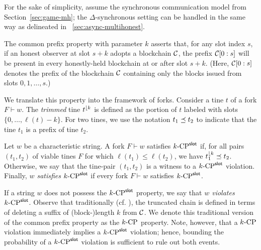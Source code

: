   For the sake of simplicity, 
  assume the synchronous communication model from Section~\ref{sec:game-mh}; 
  the $\Delta$-synchronous setting can be handled in the same way 
  as delineated in \Section~\ref{sec:async-multihonest}.

  The common prefix property with parameter $k$ asserts
  that, for any slot index $s$, if an honest observer at slot $s + k$
  adopts a blockchain $\mathcal{C}$, the prefix $\mathcal{C}[0 : s]$ will be
  present in every honestly-held blockchain at or after slot $s + k$.
  (Here, $\mathcal{C}[0 : s]$ denotes the prefix of the blockchain $\mathcal{C}$
  containing only the blocks issued from slots $0, 1, \ldots, s$.)

  We translate this property into the framework of forks.  Consider a
  tine $t$ of a fork $F \vdash w$.  The \emph{trimmed} tine
  $t^{\lfloor {k}}$ is defined as the portion of $t$ labeled with slots
  $\{ 0, \ldots, \ell(t) - k\}$. For two tines, we use the notation
  $t_1 \preceq t_2$ to indicate that the tine $t_1$ is a
  prefix of tine $t_2$.

  \begin{definition}\label{def:cp-slot-mh}
    Let $w$ be a characteristic string. A fork $F \vdash w$ satisfies
    ${k}\text{-}\mathrm{CP}^{\mathsf{slot}}$ if, for all pairs $(t_1, t_2)$ of viable tines $F$ for
    which $\ell(t_1) \leq \ell(t_2)$, we have $t_1^{\lfloor {k}} \preceq t_2$. 
    Otherwise, we say that the tine-pair $(t_1, t_2)$ is a witness to a ${k}\text{-}\mathrm{CP}^{\mathsf{slot}}$ violation.
    Finally, \emph{$w$ satisfies ${k}\text{-}\mathrm{CP}^{\mathsf{slot}}$} if every fork $F \vdash w$ satisfies ${k}\text{-}\mathrm{CP}^{\mathsf{slot}}$.
  \end{definition} 
  If a string $w$ does not possess the ${k}\text{-}\mathrm{CP}^{\mathsf{slot}}$ property, 
  we say that \emph{$w$ violates ${k}\text{-}\mathrm{CP}^{\mathsf{slot}}$}.
  Observe that traditionally
  (cf. \cite{GKL17}), 
  the truncated chain 
  is defined in terms of
  deleting a suffix of (block-)length $k$ from $\mathcal{C}$. 
  We denote this traditional version of the common prefix property as the
  ${k}\text{-}\mathrm{CP}$ property. Note, however, that a ${k}\text{-}\mathrm{CP}$ violation immediately
  implies a ${k}\text{-}\mathrm{CP}^{\mathsf{slot}}$ violation; hence, bounding the probability of a
  ${k}\text{-}\mathrm{CP}^{\mathsf{slot}}$ violation is sufficient to rule out both events.

